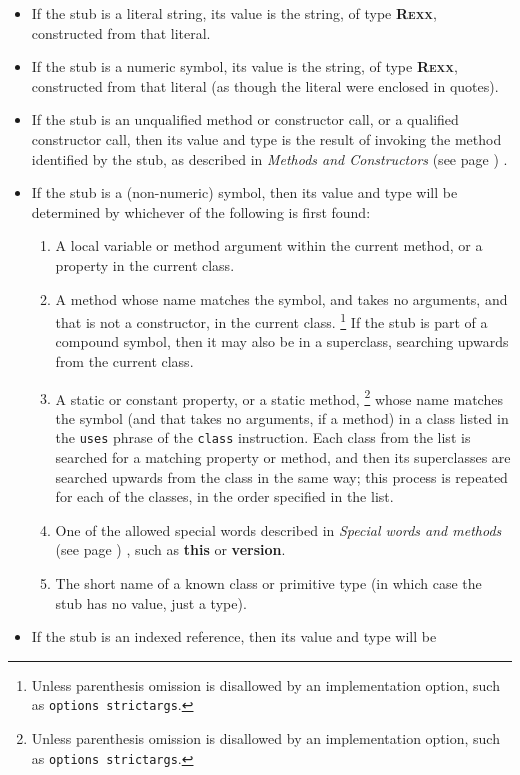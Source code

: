 \begin{itemize}
\item 
If the stub is a literal string, its value is the string, of
type \textbf{R\textsc{exx}}, constructed from that literal.
\item 
If the stub is a numeric symbol, its value is the string, of
type \textbf{R\textsc{exx}}, constructed from that literal (as though the
literal were enclosed in quotes).
\item 
If the stub is an unqualified method or constructor call, or a
qualified constructor call, then its value and type is the result of
invoking the method identified by the stub, as described in
 \emph{Methods and Constructors} (see page \pageref{refmethcon}) .
\item 
If the stub is a (non-numeric) symbol, then its value and type will be
determined by whichever of the following is first found:
\begin{enumerate}
\item A local variable or method argument within the current method, or a
property in the current class.
\item A method whose name matches the symbol, and takes no arguments, and
that is not a constructor, in the current class.
\footnote{
Unless parenthesis omission is disallowed by an implementation option,
such as \texttt{options strictargs}.
}
If the stub is part of a compound symbol, then it may also be in a
superclass, searching upwards from the current class.
\item A static or constant property, or a static method,
\footnote{
Unless parenthesis omission is disallowed by an implementation option,
such as \texttt{options strictargs}.
}
whose name matches the symbol (and that takes no arguments, if a method)
in a class listed in the \texttt{uses} phrase of the \texttt{class}
instruction.
Each class from the list is searched for a matching property or method, and
then its superclasses are searched upwards from the class in the same
way; this process is repeated for each of the classes, in the order
specified in the list.
\item One of the allowed special words described in
 \emph{Special words and methods} (see page \pageref{refspecial}) , such
as \textbf{this} or \textbf{version}.
\item The short name of a known class or primitive type (in which
case the stub has no value, just a type).
\end{enumerate}
\item 
If the stub is an indexed reference, then its value and type will be

\end{itemize}
